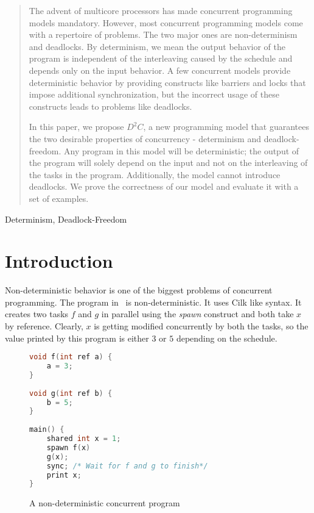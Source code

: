 \documentclass[10pt, conference, compsocconf]{IEEEtran}
\begin{document}
\begin{abstract}
The advent of multicore processors has made concurrent programming models mandatory. However, most concurrent programming models come with a repertoire of problems.
The two major ones are non-determinism and deadlocks. By determinism, we mean the output behavior of the program is 
independent of the interleaving caused by the schedule and depends only on the 
input behavior. A few concurrent models provide deterministic behavior by providing constructs like barriers and locks that impose additional synchronization, 
but the incorrect usage of these constructs 
leads to problems like deadlocks. 

In this paper, we propose $D^2C$, a new programming model that guarantees
the two desirable properties of concurrency - determinism and deadlock-freedom.
Any program in this model will be deterministic; the output of the program
will solely depend on the input and not on the interleaving of the tasks in the program.
Additionally, the model cannot  introduce deadlocks.
We prove the correctness of our model and evaluate it with a set of examples.

\end{abstract}

\begin{IEEEkeywords}
Determinism, Deadlock-Freedom

\end{IEEEkeywords}

\section{Introduction}

Non-deterministic  behavior  is one of the biggest problems of concurrent programming. The program in~ is non-deterministic. It uses 
Cilk\cite{blumofe1995cilk} 
like syntax. It creates two tasks $f$ and $g$ in parallel using the \emph{spawn} construct and both take $x$ by reference. Clearly, $x$ is getting 
modiﬁed concurrently by both the tasks, so the value printed by this program is either $3$ or $5$ 
depending on the schedule. 

\begin{figure}[htbp]
\begin{lstlisting}[language=C]
void f(int ref a) { 
    a = 3; 
} 
 
void g(int ref b) { 
    b = 5; 
} 
 
main() { 
    shared int x = 1; 
    spawn f(x) 
    g(x); 
    sync; /* Wait for f and g to finish*/  
    print x; 
} 
\end{lstlisting}
\caption{A non-deterministic concurrent program}
\label{fig:non-det}
\end{figure}
\end{document}
